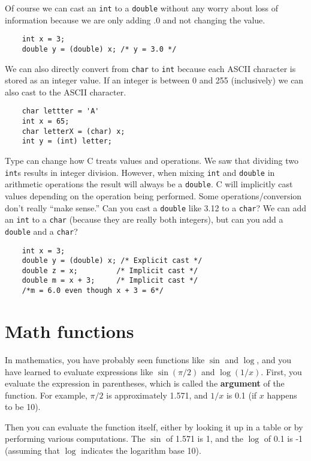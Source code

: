 Of course we can cast an {\tt int} to a {\tt double} without any worry about loss of 
information because we are only adding .0 and not changing the value. 
\begin{verbatim}
    int x = 3;
    double y = (double) x; /* y = 3.0 */
\end{verbatim}
%
We can also directly convert from {\tt char} to {\tt int} because each ASCII character is stored 
as an integer value. If an integer is between 0 and 255 (inclusively) we can also cast to the ASCII character.
\begin{verbatim}
    char lettter = 'A'
    int x = 65;
    char letterX = (char) x;
    int y = (int) letter;
\end{verbatim}
%
Type can change how C treats values and operations.  
We saw that dividing two {\tt int}s results in integer division. 
However,  when mixing {\tt int} and {\tt double} in arithmetic operations the result will always be a {\tt double}. C will implicitly cast values depending on the operation being performed. Some operations/conversion don't really ``make sense.'' Can you cast a  {\tt double} like 3.12 to a {\tt char}? We can add an {\tt int} to a {\tt char} (because they are really both integers), but can you add a {\tt double} and a {\tt char}?
\begin{verbatim}
    int x = 3;
    double y = (double) x; /* Explicit cast */
    double z = x;         /* Implicit cast */
    double m = x + 3;     /* Implicit cast */
    /*m = 6.0 even though x + 3 = 6*/
\end{verbatim}
%

\section{Math functions}

In mathematics, you have probably seen functions like $\sin$ and
$\log$, and you have learned to evaluate expressions like
$\sin(\pi/2)$ and $\log(1/x)$.  First, you evaluate the
expression in parentheses, which is called the {\bf argument} of the
function.  For example, $\pi/2$ is approximately 1.571, and $1/x$ is
0.1 (if $x$ happens to be 10).

Then you can evaluate the function itself, either by looking it up in
a table or by performing various computations.  The $\sin$ of 1.571 is
1, and the $\log$ of 0.1 is -1 (assuming that $\log$ indicates the
logarithm base 10).

